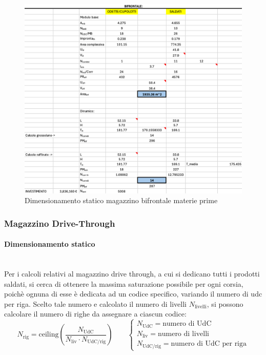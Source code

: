 \documentclass[11pt]{article}
\begin{document}
\begin{figure} [H]
    \centering
    \includegraphics[width=\textwidth]{images/Dimensionamento statico magazzino bifrontale MP.png}
    \caption{Dimensionamento statico magazzino bifrontale materie prime}
    \label{fig: Dimensionamento statico magazzino bifrontale MP}
\end{figure}
\newpage

\subsubsection{Magazzino Drive-Through}
\paragraph{Dimensionamento statico}\mbox{}\\
Per i calcoli relativi al magazzino drive through, a cui si dedicano tutti i prodotti saldati, si cerca di ottenere la massima saturazione possibile per ogni corsia, poichè ognuna di esse è dedicata ad un codice specifico, variando il numero di udc per riga. Scelto tale numero e calcolato il numero di livelli $N_\text{livelli}$, si possono calcolare il numero di righe da assegnare a ciascun codice:
\begin{equation}
    N_\text{rig} = \text{ceiling}\left(\frac{N_\text{UdC}}{N_\text{liv} \cdot N_\text{UdC/rig}}\right)
    \qquad
    \begin{cases}
        N_\text{UdC} = \text{numero di UdC} \\
        N_\text{liv} = \text{numero di livelli} \\
        N_\text{UdC/rig} = \text{numero di UdC per riga}
    \end{cases}
\end{equation}
\end{document}
